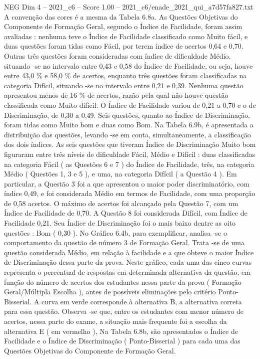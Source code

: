 \begin{textsample}{NEG Dim 4 – 2021\_c6 – Score 1.00 – 2021\_c6/enade\_2021\_qui\_a7d57fa827.txt}
A convenção das cores é a mesma da Tabela 6.8a.
As Questões Objetivas do Componente de Formação Geral, segundo o Índice de Facilidade, foram assim avaliadas : nenhuma teve o Índice de Facilidade classificado como Muito fácil, e duas questões foram tidas como Fácil, por terem índice de acertos 0,64 e 0,70.
Outras três questões foram consideradas com índice de dificuldade Médio, situando -se no intervalo entre 0,43 e 0,58 do Índice de Facilidade, ou seja, houve entre 43,0 \% e 58,0 \% de acertos, enquanto três questões foram classificadas na categoria Difícil, situando -se no intervalo entre 0,21 e 0,39.
Nenhuma questão apresentou menos de 16 \% de acertos, razão pela qual não houve questão classificada como Muito difícil.
O Índice de Facilidade variou de 0,21 a 0,70 e o de Discriminação, de 0,30 a 0,49.
Seis questões, quanto ao Índice de Discriminação, foram tidas como Muito bom e duas como Bom.
Na Tabela 6.9b, é apresentada a distribuição das questões, levando -se em conta, simultaneamente, a classificação dos dois índices.
As seis questões que tiveram Índice de Discriminação Muito bom figuraram entre três níveis de dificuldade Fácil, Médio e Difícil : duas classificadas na categoria Fácil ( as Questões 6 e 7 ) do Índice de Facilidade, três, na categoria Médio ( Questões 1, 3 e 5 ), e uma, na categoria Difícil ( a Questão 4 ).
Em particular, a Questão 3 foi a que apresentou o maior poder discriminatório, com índice 0,49, e foi considerada Médio em termos de Facilidade, com uma proporção de 0,58 acertos.
O máximo de acertos foi alcançado pela Questão 7, com um Índice de Facilidade de 0,70.
A Questão 8 foi considerada Difícil, com Índice de Facilidade 0,21.
Seu Índice de Discriminação foi o mais baixo dentre as oito questões : Bom ( 0,30 ).
No Gráfico 6.4b, para exemplificar, analisa -se o comportamento da questão de número 3 de Formação Geral.
Trata -se de uma questão considerada Médio, em relação à facilidade e a que obteve o maior Índice de Discriminação dessa parte da prova.
Neste gráfico, cada uma das cinco curvas representa o percentual de respostas em determinada alternativa da questão, em função do número de acertos dos estudantes nessa parte da prova ( Formação Geral/Múltipla Escolha ), antes de possíveis eliminações pelo critério Ponto-Bisserial.
A curva em verde corresponde à alternativa B, a alternativa correta para essa questão.
Observa -se que, entre os estudantes com menor número de acertos, nessa parte do exame, a situação mais frequente foi a escolha da alternativa E ( em vermelho ), Na Tabela 6.8b, são apresentados o Índice de Facilidade e o Índice de Discriminação ( Ponto-Bisserial ) para cada uma das Questões Objetivas do Componente de Formação Geral.

\end{textsample}
